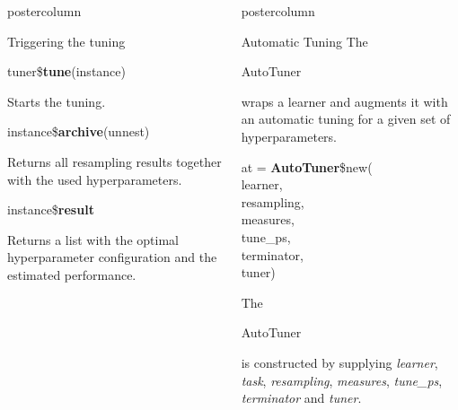 \documentclass{beamer}
\newlength{\columnheight} %
\newcommand{\codeinline}[1]{\begin{codeboxinline}#1\end{codeboxinline}}
\begin{document}
\begin{frame}[fragile]{}
\begin{columns}
\begin{column}{.245\textwidth}
\begin{beamercolorbox}[center]{postercolumn}
\begin{minipage}{.98\textwidth}
{\begin{myblock}{Triggering the tuning}
							\begin{codebox}
								tuner\$\textbf{tune}(instance)
							\end{codebox}
							Starts the tuning.
							\\
							\begin{codebox}
								instance\$\textbf{archive}(unnest)
							\end{codebox}
							Returns all resampling results together with the used hyperparameters.
							\\
							\begin{codebox}
								instance\$\textbf{result}
							\end{codebox}
							Returns a list with the optimal hyperparameter configuration and the estimated performance.
						\end{myblock}
					\vfill}
				\end{minipage}
			\end{beamercolorbox}
		\end{column}
		\begin{column}{.245\textwidth}
			\begin{beamercolorbox}[center]{postercolumn}
				\begin{minipage}{.98\textwidth}
					\parbox[t][\columnheight]{\textwidth}{
						\begin{myblock}{Automatic Tuning}
						The \codeinline{AutoTuner} wraps a learner and augments it with an automatic tuning for a given set of hyperparameters. 
						\\
						\begin{codeboxmultiline}[width=18cm]
							at = \textbf{AutoTuner}\$new(
\\
							\hspace*{1ex}learner,
\\
							\hspace*{1ex}resampling,
\\
							\hspace*{1ex}measures,
\\
							\hspace*{1ex}tune\_ps,
\\
							\hspace*{1ex}terminator,
\\
							\hspace*{1ex}tuner)
						\end{codeboxmultiline}
						The \codeinline{AutoTuner} is constructed by supplying \textit{learner}, \textit{task},  \textit{resampling}, \textit{measures}, \textit{tune\_ps}, \textit{terminator} and \textit{tuner}. 

\end{myblock}}
\end{minipage}
\end{beamercolorbox}
\end{column}
\end{columns}
\end{frame}
\end{document}
